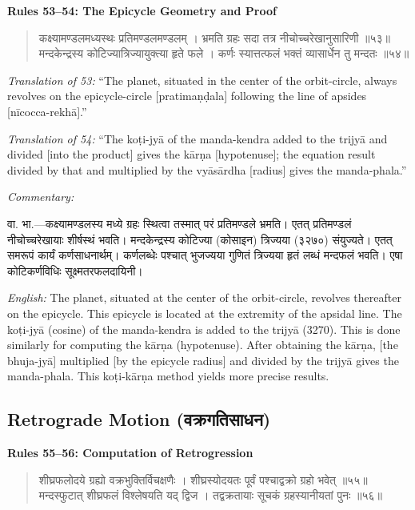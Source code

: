 \documentclass[11pt,a4paper]{book}
\newcommand{\dev}[1]{{\devanagarifont #1}}
\newenvironment{shloka}{%
  \begin{verse}
  \devanagarifont\color{versecolor}%
}{\end{verse}}
\newenvironment{vasaanaskt}{%
  \par\vspace{0.5em}\noindent\small\textit{Commentary:}%
}{\par\vspace{0.5em}}
\newcommand{\ruleheading}[1]{%
  \par\vspace{0.8em}\noindent\textbf{\color{sectioncolor}#1}\par\vspace{0.3em}%
}
\begin{document}
\ruleheading{Rules 53--54: The Epicycle Geometry and Proof}

\begin{shloka}
\begin{altverse}
\dev{कक्ष्यामण्डलमध्यस्थः प्रतिमण्डलमण्डलम् ।}
\dev{भ्रमति ग्रहः सदा तत्र नीचोच्चरेखानुसारिणी ॥५३॥}
\dev{मन्दकेन्द्रस्य कोटिज्यात्रिज्यायुक्त्या हृते फले ।}
\dev{कर्णः स्यात्तत्फलं भक्तं व्यासार्धेन तु मन्दतः ॥५४॥}
\end{altverse}
\end{shloka}

\textit{Translation of 53:} ``The planet, situated in the center of the orbit-circle, always revolves on the epicycle-circle [pratimaṇḍala] following the line of apsides [nīcocca-rekhā].''

\textit{Translation of 54:} ``The koṭi-jyā of the manda-kendra added to the trijyā and divided [into the product] gives the kārṇa [hypotenuse]; the equation result divided by that and multiplied by the vyāsārdha [radius] gives the manda-phala.''

\begin{vasaanaskt}
\dev{वा. भा.}---कक्ष्यामण्डलस्य मध्ये ग्रहः स्थित्वा तस्मात् परं प्रतिमण्डले भ्रमति। एतत् प्रतिमण्डलं नीचोच्चरेखायाः शीर्षस्थं भवति। मन्दकेन्द्रस्य कोटिज्या (कोसाइन) त्रिज्यया (३२७०) संयुज्यते। एतत् समरूपं कार्यं कर्णसाधनार्थम्। कर्णलब्धेः पश्चात् भुजज्यया गुणितं त्रिज्यया हृतं लब्धं मन्दफलं भवति। एषा कोटिकर्णविधिः सूक्ष्मतरफलदायिनी।

\textit{English:} The planet, situated at the center of the orbit-circle, revolves thereafter on the epicycle. This epicycle is located at the extremity of the apsidal line. The koṭi-jyā (cosine) of the manda-kendra is added to the trijyā (3270). This is done similarly for computing the kārṇa (hypotenuse). After obtaining the kārṇa, [the bhuja-jyā] multiplied [by the epicycle radius] and divided by the trijyā gives the manda-phala. This koṭi-kārṇa method yields more precise results.
\end{vasaanaskt}

\subsection{Retrograde Motion (\dev{वक्रगतिसाधन})}

\ruleheading{Rules 55--56: Computation of Retrogression}

\begin{shloka}
\begin{altverse}
\dev{शीघ्रफलोदये ग्रह्यो वक्रभुक्तिर्विचक्षणैः ।}
\dev{शीघ्रस्योदयतः पूर्वं पश्चाद्वक्रो ग्रहो भवेत् ॥५५॥}
\dev{मन्दस्फुटात् शीघ्रफलं विश्लेषयति यद् द्विज ।}
\dev{तद्वक्रतायाः सूचकं ग्रहस्यानीयतां पुनः ॥५६॥}
\end{altverse}
\end{shloka}
\end{document}
